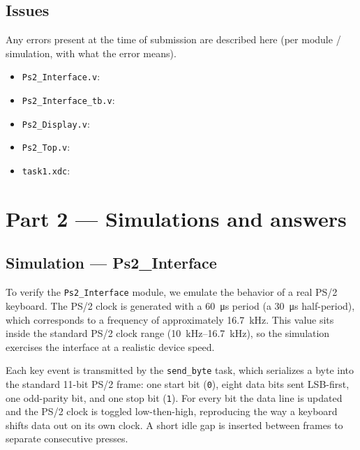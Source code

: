 \documentclass[11pt,a4paper]{article}
\begin{document}
\subsection*{Issues}

Any errors present at the time of submission are described here (per module /
simulation, with what the error means).

\begin{itemize}[topsep=2pt,itemsep=2pt,leftmargin=1.4em]
  \item \texttt{Ps2\_Interface.v}:
  \item \texttt{Ps2\_Interface\_tb.v}:
  \item \texttt{Ps2\_Display.v}:
  \item \texttt{Ps2\_Top.v}:
  \item \texttt{task1.xdc}:
\end{itemize}

\newpage
\section*{Part 2 --- Simulations and answers}
\vspace{1cm}
\subsection*{Simulation --- Ps2\_Interface}








To verify the \texttt{Ps2\_Interface} module, we  emulate the behavior of a real PS/2 keyboard. The PS/2 clock is generated with a
\SI{60}{\micro\second} period (a \SI{30}{\micro\second} half-period),
which corresponds to a frequency of approximately \SI{16.7}{\kilo\hertz}.
This value sits inside the standard PS/2 clock range
(\SIrange{10}{16.7}{\kilo\hertz}), so the simulation exercises the
interface at a realistic device speed.

Each key event is transmitted by the \texttt{send\_byte} task, which
serializes a byte into the standard 11-bit PS/2 frame:
one start bit (\texttt{0}), eight data bits sent LSB-first, one odd-parity
bit, and one stop bit (\texttt{1}). For every bit the data line is updated
and the PS/2 clock is toggled low-then-high, reproducing the way a keyboard
shifts data out on its own clock. A short idle gap is inserted between
frames to separate consecutive presses.
\end{document}
